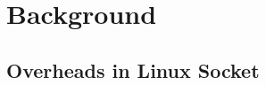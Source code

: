 \section{Background}
\label{sec:background}

\subsection{Overheads in Linux Socket}
\label{subsec:motivation}






